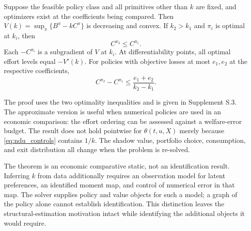 \begin{theorem}
\label{thm:k}
Suppose the feasible policy class and all primitives other than $k$ are fixed, and optimizers exist at the coefficients being compared. Then
$V(k)=\sup_\pi\{B^\pi-kC^\pi\}$ is decreasing and convex. If $k_2>k_1$ and $\pi_i$ is optimal at $k_i$, then
\begin{equation}
 C^{\pi_2}\leq C^{\pi_1}.
 \label{eq:effort_monotonicity}
\end{equation}
Each $-C^{\pi_i}$ is a subgradient of $V$ at $k_i$. At differentiability points, all optimal effort levels equal $-V'(k)$. For policies with objective losses at most $e_1,e_2$ at the respective coefficients,
\begin{equation}
 C^{\pi_2}-C^{\pi_1}\leq\frac{e_1+e_2}{k_2-k_1}.
 \label{eq:effort_approximate}
\end{equation}
\end{theorem}

The proof uses the two optimality inequalities and is given in Supplement S.3. The approximate version is useful when numerical policies are used in an economic comparison: the effort ordering can be assessed against a welfare-error budget. The result does not hold pointwise for $\theta(t,u,X)$ merely because \eqref{eq:ndu_controls} contains $1/k$. The shadow value, portfolio choice, consumption, and exit distribution all change when the problem is re-solved.

The theorem is an economic comparative static, not an identification result. Inferring $k$ from data additionally requires an observation model for latent preferences, an identified moment map, and control of numerical error in that map. The solver supplies policy and value objects for such a model; a graph of the policy alone cannot establish identification. This distinction leaves the structural-estimation motivation intact while identifying the additional objects it would require.
